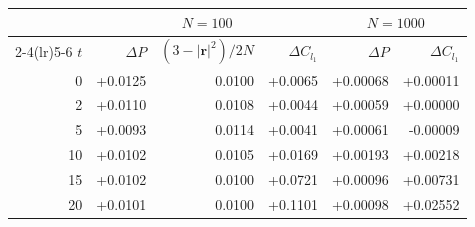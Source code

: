 \begin{tabular}{rrrrrr}
\toprule
& \multicolumn{3}{c}{$N=100$} & \multicolumn{2}{c}{$N=1000$} \\
\cmidrule(lr){2-4}\cmidrule(lr){5-6}
$t$ & $\Delta P$ & $(3-|\mathbf r|^2)/2N$ & $\Delta C_{l_1}$ & $\Delta P$ & $\Delta C_{l_1}$ \\
\midrule
0 & +0.0125 & 0.0100 & +0.0065 & +0.00068 & +0.00011 \\
2 & +0.0110 & 0.0108 & +0.0044 & +0.00059 & +0.00000 \\
5 & +0.0093 & 0.0114 & +0.0041 & +0.00061 & -0.00009 \\
10 & +0.0102 & 0.0105 & +0.0169 & +0.00193 & +0.00218 \\
15 & +0.0102 & 0.0100 & +0.0721 & +0.00096 & +0.00731 \\
20 & +0.0101 & 0.0100 & +0.1101 & +0.00098 & +0.02552 \\
\bottomrule
\end{tabular}
